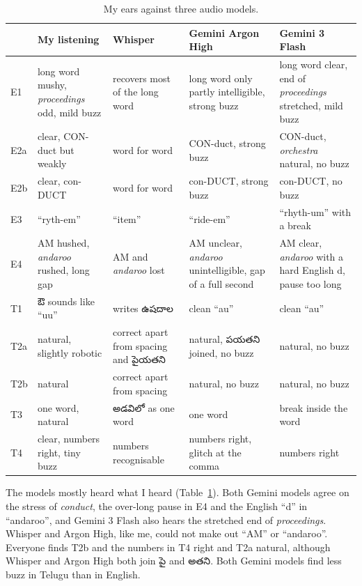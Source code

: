 \documentclass[11pt,a4paper]{article}
\newcommand{\te}[1]{{\telugufont #1}}
\begin{document}
\begin{table}[!htbp]
\centering\footnotesize
\begin{tabularx}{\textwidth}{l>{\raggedright\arraybackslash}X>{\raggedright\arraybackslash}X>{\raggedright\arraybackslash}X>{\raggedright\arraybackslash}X}
\toprule
& \textbf{My listening} & \textbf{Whisper} & \textbf{Gemini Argon High} & \textbf{Gemini 3 Flash} \\
\midrule
E1 & long word mushy, \emph{proceedings} odd, mild buzz & recovers most of the long word & long word only partly intelligible, strong buzz & long word clear, end of \emph{proceedings} stretched, mild buzz \\
E2a & clear, CON-duct but weakly & word for word & CON-duct, strong buzz & CON-duct, \emph{orchestra} natural, no buzz \\
E2b & clear, con-DUCT & word for word & con-DUCT, strong buzz & con-DUCT, no buzz \\
E3 & “ryth-em” & “item” & “ride-em” & “rhyth-um” with a break \\
E4 & AM hushed, \emph{andaroo} rushed, long gap & AM and \emph{andaroo} lost & AM unclear, \emph{andaroo} unintelligible, gap of a full second & AM clear, \emph{andaroo} with a hard English d, pause too long \\
T1 & \te{ఔ} sounds like “uu” & writes \te{ఉషదాల} & clean “au” & clean “au” \\
T2a & natural, slightly robotic & correct apart from spacing and \te{పైయతని} & natural, \te{పయతని} joined, no buzz & natural, no buzz \\
T2b & natural & correct apart from spacing & natural, no buzz & natural, no buzz \\
T3 & one word, natural & \te{అడవిలో} as one word & one word & break inside the word \\
T4 & clear, numbers right, tiny buzz & numbers recognisable & numbers right, glitch at the comma & numbers right \\
\bottomrule
\end{tabularx}
\caption{My ears against three audio models.}
\label{tab:second}
\end{table}

The models mostly heard what I heard (Table~\ref{tab:second}). Both Gemini models agree on the stress of \emph{conduct}, the over-long
pause in E4 and the English “d” in “andaroo”, and Gemini 3 Flash also hears the stretched end of
\emph{proceedings}. Whisper and Argon High, like me, could not make out “AM” or “andaroo”. Everyone finds T2b
and the numbers in T4 right and T2a natural, although Whisper and Argon High both join \te{పై} and \te{అతని}.
Both Gemini models find less buzz in Telugu than in English.
\end{document}
